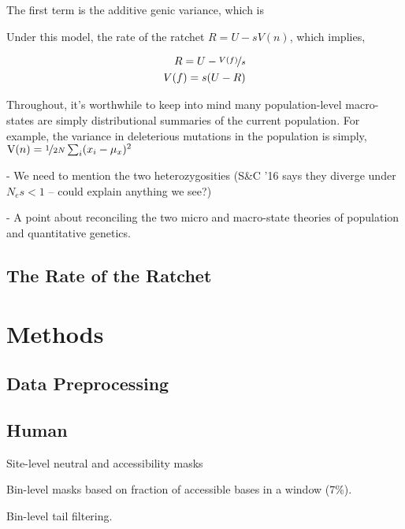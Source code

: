 \documentclass[11pt]{article}
\newcommand{\V}{\text{V}}
\begin{document}
The first term is the additive genic variance, which is 


Under this model, the rate of the ratchet $R = U  - s V(n)$, which implies,

\begin{align}
  R = U - \nicefrac{V(f)}{s} \\
  V(f) = s(U - R)
\end{align}



Throughout, it's worthwhile to keep into mind many population-level
macro-states are simply distributional summaries of the current population. For
example, the variance in deleterious mutations in the population is simply,
$\V(n) = \nicefrac{1}{2N} \sum_i (x_i - \mu_x)^2$





- We need to mention the two heterozygosities (S\&C '16 says they diverge under
$N_e s < 1$ -- could explain anything we see?)

- A point about reconciling the two micro and macro-state theories of
population and quantitative genetics.





\subsection*{The Rate of the Ratchet}


\section*{Methods}

\subsection*{Data Preprocessing}

\subsection*{Human}

Site-level neutral and accessibility masks

Bin-level masks based on fraction of accessible bases in a window (7\%).

Bin-level tail filtering.

\printbibliography
\end{document}
